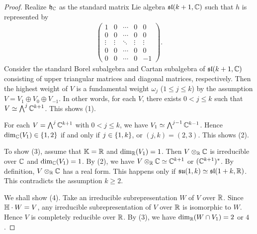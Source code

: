 \begin{proof}
	Realize $\mathfrak{h}_{\mathbb{C}}$ as the standard matrix Lie algebra $\mathfrak{sl}(k+1, \mathbb{C})$ such that $h$ is represented by
	\begin{align*}
		\begin{pmatrix}
			1 & 0 & \cdots & 0 & 0 \\
			0 & 0 & \cdots & 0 & 0 \\
			\vdots & \vdots & \ddots & \vdots & \vdots \\
			0 & 0 & \cdots & 0 & 0 \\
			0 & 0 & \cdots & 0 & -1
		\end{pmatrix}.
	\end{align*}
	Consider the standard Borel subalgebra and Cartan subalgebra of $\mathfrak{sl}(k+1, \mathbb{C})$ consisting of upper triangular matrices and diagonal matrices, respectively.
	Then the highest weight of $V$ is a fundamental weight $\omega_j$ ($1 \leq j \leq k$) by the assumption $V = V_1 \oplus V_0 \oplus V_{-1}$.
	In other words, for each $V$, there exists $0 < j \leq k$ such that $V \simeq \bigwedge\nolimits^j \mathbb{C}^{k+1}$.
	This shows (1).

	For each $V = \bigwedge\nolimits^j \mathbb{C}^{k+1}$ with $0 < j \leq k$, we have $V_1 \simeq \bigwedge\nolimits^{j-1} \mathbb{C}^{k-1}$.
	Hence $\dim_{\mathbb{C}}(V_1) \in \left\{1, 2 \right\}$ if and only if $j \in \left\{1, k \right\}$, or $(j, k) = (2, 3)$.
	This shows (2).

	To show (3), assume that $\mathbb{K} = \mathbb{R}$ and $\dim_{\mathbb{R}}(V_1) = 1$.
	Then $V\otimes_{\mathbb{R}} \mathbb{C}$ is irreducible over $\mathbb{C}$ and $\dim_{\mathbb{C}}(V_1) = 1$.
	By (2), we have $V\otimes_{\mathbb{R}} \mathbb{C} \simeq \mathbb{C}^{k+1}$ or $(\mathbb{C}^{k+1})^*$.
	By definition, $V\otimes_{\mathbb{R}}\mathbb{C}$ has a real form.
	This happens only if $\mathfrak{su}(1, k) \simeq \mathfrak{sl}(1+k, \mathbb{R})$.
	This contradicts the assumption $k \geq 2$.

	We shall show (4).
	Take an irreducible subrepresentation $W$ of $V$ over $\mathbb{R}$.
	Since $\mathbb{H}\cdot W = V$, any irreducible subrepresentation of $V$ over $\mathbb{R}$ is isomorphic to $W$.
	Hence $V$ is completely reducible over $\mathbb{R}$.
	By (3), we have $\dim_{\mathbb{R}}(W \cap V_1) = 2$ or $4$.
	

\end{proof}
